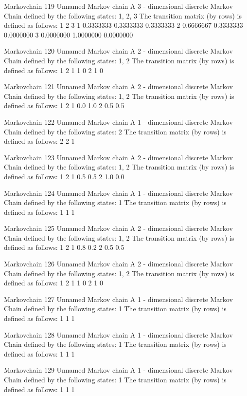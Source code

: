 \documentclass[
  nojss]{jss}
\begin{document}
\begin{CodeChunk}
\begin{CodeOutput}
Markovchain  119 
Unnamed Markov chain 
 A  3 - dimensional discrete Markov Chain defined by the following states: 
 1, 2, 3 
 The transition matrix  (by rows)  is defined as follows: 
          1         2         3
1 0.3333333 0.3333333 0.3333333
2 0.6666667 0.3333333 0.0000000
3 0.0000000 1.0000000 0.0000000

Markovchain  120 
Unnamed Markov chain 
 A  2 - dimensional discrete Markov Chain defined by the following states: 
 1, 2 
 The transition matrix  (by rows)  is defined as follows: 
  1 2
1 1 0
2 1 0

Markovchain  121 
Unnamed Markov chain 
 A  2 - dimensional discrete Markov Chain defined by the following states: 
 1, 2 
 The transition matrix  (by rows)  is defined as follows: 
    1   2
1 0.0 1.0
2 0.5 0.5

Markovchain  122 
Unnamed Markov chain 
 A  1 - dimensional discrete Markov Chain defined by the following states: 
 2 
 The transition matrix  (by rows)  is defined as follows: 
  2
2 1

Markovchain  123 
Unnamed Markov chain 
 A  2 - dimensional discrete Markov Chain defined by the following states: 
 1, 2 
 The transition matrix  (by rows)  is defined as follows: 
    1   2
1 0.5 0.5
2 1.0 0.0

Markovchain  124 
Unnamed Markov chain 
 A  1 - dimensional discrete Markov Chain defined by the following states: 
 1 
 The transition matrix  (by rows)  is defined as follows: 
  1
1 1

Markovchain  125 
Unnamed Markov chain 
 A  2 - dimensional discrete Markov Chain defined by the following states: 
 1, 2 
 The transition matrix  (by rows)  is defined as follows: 
    1   2
1 0.8 0.2
2 0.5 0.5

Markovchain  126 
Unnamed Markov chain 
 A  2 - dimensional discrete Markov Chain defined by the following states: 
 1, 2 
 The transition matrix  (by rows)  is defined as follows: 
  1 2
1 1 0
2 1 0

Markovchain  127 
Unnamed Markov chain 
 A  1 - dimensional discrete Markov Chain defined by the following states: 
 1 
 The transition matrix  (by rows)  is defined as follows: 
  1
1 1

Markovchain  128 
Unnamed Markov chain 
 A  1 - dimensional discrete Markov Chain defined by the following states: 
 1 
 The transition matrix  (by rows)  is defined as follows: 
  1
1 1

Markovchain  129 
Unnamed Markov chain 
 A  1 - dimensional discrete Markov Chain defined by the following states: 
 1 
 The transition matrix  (by rows)  is defined as follows: 
  1
1 1


\end{CodeOutput}
\end{CodeChunk}
\end{document}
